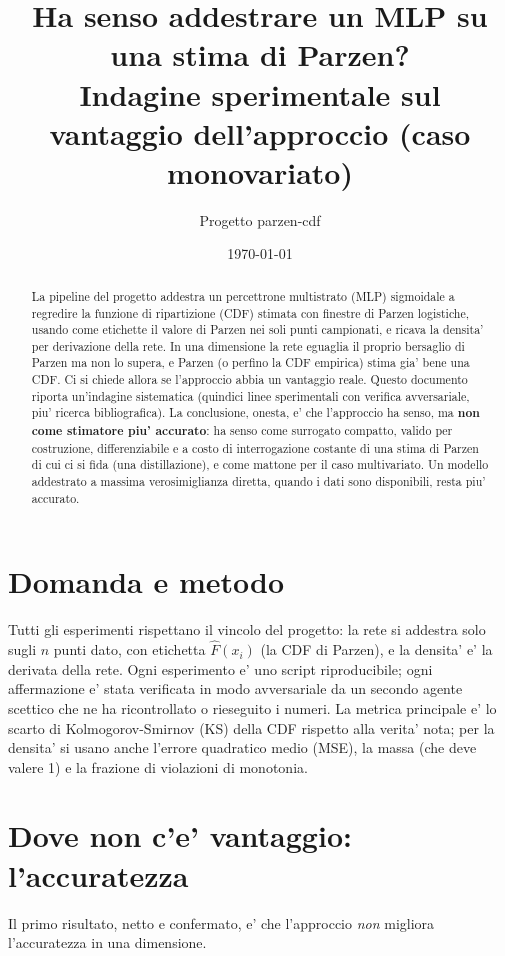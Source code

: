 \documentclass[11pt]{article}
\title{Ha senso addestrare un MLP su una stima di Parzen?\\
\large Indagine sperimentale sul vantaggio dell'approccio (caso monovariato)}
\author{Progetto parzen-cdf}
\date{\today}
\begin{document}
\maketitle

\begin{abstract}
La pipeline del progetto addestra un percettrone multistrato (MLP) sigmoidale a regredire la funzione
di ripartizione (CDF) stimata con finestre di Parzen logistiche, usando come etichette il valore di
Parzen nei soli punti campionati, e ricava la densita' per derivazione della rete. In una dimensione
la rete eguaglia il proprio bersaglio di Parzen ma non lo supera, e Parzen (o perfino la CDF empirica)
stima gia' bene una CDF. Ci si chiede allora se l'approccio abbia un vantaggio reale. Questo documento
riporta un'indagine sistematica (quindici linee sperimentali con verifica avversariale, piu' ricerca
bibliografica). La conclusione, onesta, e' che l'approccio ha senso, ma \textbf{non come stimatore piu'
accurato}: ha senso come surrogato compatto, valido per costruzione, differenziabile e a costo di
interrogazione costante di una stima di Parzen di cui ci si fida (una distillazione), e come mattone
per il caso multivariato. Un modello addestrato a massima verosimiglianza diretta, quando i dati sono
disponibili, resta piu' accurato.
\end{abstract}

\section{Domanda e metodo}

Tutti gli esperimenti rispettano il vincolo del progetto: la rete si addestra solo sugli $n$ punti
dato, con etichetta $\widehat F(x_i)$ (la CDF di Parzen), e la densita' e' la derivata della rete.
Ogni esperimento e' uno script riproducibile; ogni affermazione e' stata verificata in modo
avversariale da un secondo agente scettico che ne ha ricontrollato o rieseguito i numeri. La metrica
principale e' lo scarto di Kolmogorov-Smirnov (KS) della CDF rispetto alla verita' nota; per la densita'
si usano anche l'errore quadratico medio (MSE), la massa (che deve valere 1) e la frazione di
violazioni di monotonia.

\section{Dove non c'e' vantaggio: l'accuratezza}

Il primo risultato, netto e confermato, e' che l'approccio \emph{non} migliora l'accuratezza in una
dimensione.
\end{document}
